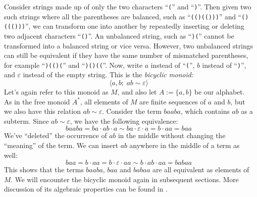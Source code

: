 \documentclass[../generics]{subfiles}
\begin{document}
\iffalse
\begin{example}
Take a regular hexagon centered on the origin, and consider the linear transformations which map the outline of the hexagon back to itself. These are called the \emph{symmetries} of the hexagon. Each symmetry defines a permutation of the sides of the hexagon, and the composition of two symmetries is another symmetry. Two examples of such symmetries are rotation clockwise by $60^{\circ}$, and a reflection across the $x$ axis. In fact, every symmetry of the hexagon can be expressed as a composition of these two. Let's call the rotation $s$ and the reflection $t$, these two fundamental symmetries have the following properties:
\begin{itemize}
\item If we perform six rotations in a row, we end up where we started.

\end{example}
\fi
\begin{example}\label{bicyclic}
Consider strings made up of only the two characters ``\texttt{(}'' and ``\texttt{)}''. Then given two such strings where all the parentheses are balanced, such as ``\texttt{(()(()))}'' and ``\texttt{()((()))}'', we can transform one into another by repeatedly inserting or deleting two adjacent characters ``\texttt{()}''. An unbalanced string, such as ``\texttt{)(}'' cannot be transformed into a balanced string or vice versa. However, two unbalanced strings can still be equivalent if they have the same number of mismatched parentheses, for example ``\texttt{)(()(}'' and ``\texttt{)()((}''. Now, write $a$ instead of ``\texttt{(}'', $b$ instead of ``\texttt{)}'', and $\varepsilon$ instead of the empty string. This is the \emph{bicyclic monoid}:
\[\langle a, b;\; ab\sim\varepsilon\rangle\]
Let's again refer to this monoid as $M$, and also let $A:=\{a,b\}$ be our alphabet. As in the free monoid $A^*$, all elements of $M$ are finite sequences of $a$ and $b$, but we also have this relation $ab\sim\varepsilon$. Consider the term $baaba$, which contains $ab$ as a subterm. Since $ab\sim\varepsilon$, we have the following equivalence:
\[baaba=ba\cdot ab\cdot a\sim ba\cdot\varepsilon\cdot a=b\cdot aa = baa\]
We've ``deleted'' the occurrence of $ab$ in the middle without changing the ``meaning'' of the term. We can insert $ab$ anywhere in the middle of a term as well:
\[baa=b\cdot aa=b\cdot\varepsilon\cdot aa\sim b\cdot ab\cdot aa=babaa\]
This shows that the terms $baaba$, $baa$ and $babaa$ are all equivalent as elements of $M$. We will encounter the bicyclic monoid again in subsequent sections. More discussion of its algebraic properties can be found in \cite{semigroup}.
\end{example}
\end{document}
